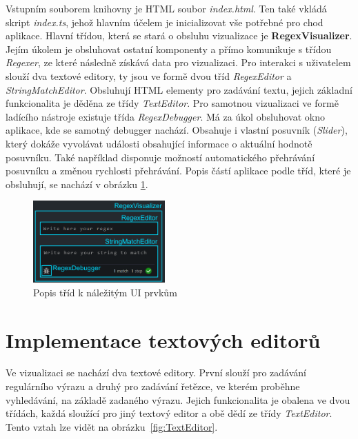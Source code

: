 Vstupním souborem knihovny je HTML soubor \textit{index.html}.
Ten také vkládá skript \textit{index.ts}, jehož hlavním účelem je inicializovat vše potřebné pro chod aplikace.
Hlavní třídou, která se stará o obsluhu vizualizace je \textbf{RegexVisualizer}. 
Jejím úkolem je obsluhovat ostatní komponenty a přímo komunikuje s třídou \textit{Regexer}, ze které následně získává data pro vizualizaci.
Pro interakci s uživatelem slouží dva textové editory, ty jsou ve formě dvou tříd \textit{RegexEditor} a \textit{StringMatchEditor}.
Obsluhují HTML elementy pro zadávání textu, jejich základní funkcionalita je děděna ze třídy \textit{TextEditor}.
Pro samotnou vizualizaci ve formě ladícího nástroje existuje třída \textit{RegexDebugger}.
Má za úkol obsluhovat okno aplikace, kde se samotný debugger nachází.
Obsahuje i vlastní posuvník (\textit{Slider}), který dokáže vyvolávat události obsahující informace o aktuální hodnotě posuvníku.
Také například disponuje možností automatického přehrávání posuvníku a změnou rychlosti přehrávání.
Popis částí aplikace podle tříd, které je obsluhují, se nachází v obrázku \ref{fig:ClassesGeneralUI}.

\begin{figure}[!h]
	\centering
	\includegraphics[width=0.45\textwidth]{Figures/appWindowClassesDescription.png}
	\caption{Popis tříd k náležitým UI prvkům}
	\label{fig:ClassesGeneralUI}
\end{figure}

\section{Implementace textových editorů}

Ve vizualizaci se nachází dva textové editory.
První slouží pro zadávání regulárního výrazu a druhý pro zadávání řetězce, ve kterém proběhne vyhledávání, na základě zadaného výrazu.
Jejich funkcionalita je obalena ve dvou třídách, každá sloužící pro jiný textový editor a obě dědí ze třídy \textit{TextEditor}.
Tento vztah lze vidět na obrázku~\ref{fig:TextEditor}.

